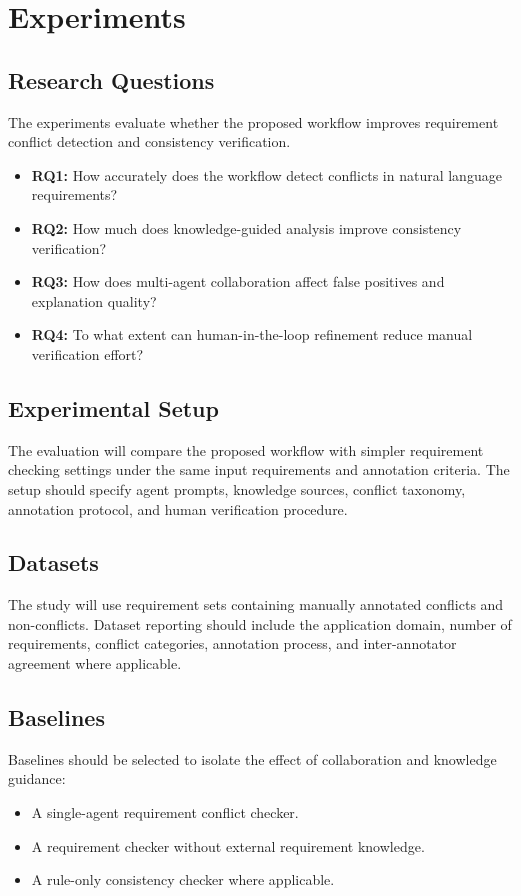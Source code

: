 \section{Experiments}
\label{experiments}

\subsection{Research Questions}
The experiments evaluate whether the proposed workflow improves requirement
conflict detection and consistency verification.
\begin{itemize}[leftmargin=*]
  \item \textbf{RQ1:} How accurately does the workflow detect conflicts in natural
  language requirements?
  \item \textbf{RQ2:} How much does knowledge-guided analysis improve consistency
  verification?
  \item \textbf{RQ3:} How does multi-agent collaboration affect false positives and
  explanation quality?
  \item \textbf{RQ4:} To what extent can human-in-the-loop refinement reduce manual
  verification effort?
\end{itemize}

\subsection{Experimental Setup}
The evaluation will compare the proposed workflow with simpler requirement checking
settings under the same input requirements and annotation criteria. The setup should
specify agent prompts, knowledge sources, conflict taxonomy, annotation protocol,
and human verification procedure.

\subsection{Datasets}
The study will use requirement sets containing manually annotated conflicts and
non-conflicts. Dataset reporting should include the application domain, number of
requirements, conflict categories, annotation process, and inter-annotator agreement
where applicable.

\subsection{Baselines}
Baselines should be selected to isolate the effect of collaboration and knowledge
guidance:
\begin{itemize}[leftmargin=*]
  \item A single-agent requirement conflict checker.
  \item A requirement checker without external requirement knowledge.
  \item A rule-only consistency checker where applicable.
\end{itemize}

